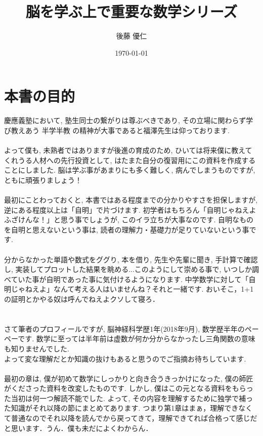\documentclass[11pt,a4paper]{jreport}
\title{脳を学ぶ上で重要な数学シリーズ}
\author{後藤 優仁}
\date{\today}
\begin{document}
\maketitle
%
%
\tableofcontents


\section{本書の目的}
慶應義塾において, 塾生同士の繋がりは尊ぶべきであり, その立場に関わらず学び教えあう 半学半教 の精神が大事であると福澤先生は仰っております. \\
\\
よって僕も, 未熟者ではありますが後進の育成のため, ひいては将来僕に教えてくれうる人材への先行投資として, はたまた自分の復習用にこの資料を作成することにしました. 脳は学ぶ事があまりにも多く難しく, 病んでしまうものですが, ともに頑張りましょう！ \\
\\
最初にことわっておくと, 本書ではある程度までの分かりやすさを担保しますが, 逆にある程度以上は「自明」で片づけます. 初学者はもちろん「自明じゃねえよふざけんな！」と思う事でしょうが, このイラ立ちが大事なのです. 自明なものを自明と思えないという事は, 読者の理解力・基礎力が足りていないという事です. \\\\
分からなかった単語や数式をググり, 本を借り, 先生や先輩に聞き, 手計算で確認し, 実装してプロットした結果を眺める...このようにして崇める事で, いつしか調べていた事が自明であった事に気付けるようになります. 中学数学に対して「自明じゃねえよ」なんて考える人はいませんね？それと一緒です. おいそこ，1+1の証明とかやる奴は呼んでねえよクソして寝ろ．\\
\\
\\
さて筆者のプロフィールですが, 脳神経科学歴1年(2018年9月), 数学歴半年のペーペーです. 数学に至っては半年前は虚数が何か分からなかったし三角関数の意味も知りませんでした.\\
よって変な理解だとか知識の抜けもあると思うのでご指摘お待ちしています.\\
\\
最初の章は, 僕が初めて数学にしっかりと向き合うきっかけになった, 僕の師匠がくださった資料を改変したものです. しかし, 僕はこの元となる資料をもらった当初は何一つ解読不能でした. よって, その内容を理解するために独学で補った知識がそれ以降の節にまとめてあります. つまり第1章はまぁ，理解できなくて普通なのでそれ以降を読んでから戻ってきて，理解できてれば合格って感じだと思います．うん．僕も未だによくわからん． \\
\\
\end{document}

